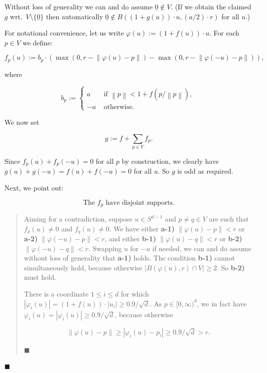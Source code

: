 \documentclass[11pt]{article}%
\newenvironment{proof}{\vspace{1ex}\noindent{\bf Proof.}}{\hspace*{\fill}$\blacksquare$\vspace{1ex}}
\newenvironment{proofof}[1]{\vspace{1ex}\noindent{\bf Proof of #1.}}{\hspace*{\fill}$\blacksquare$\vspace{1ex}}
\newcommand{\norm}[1]{\ensuremath{\left\|#1\right\|}}
\newcommand{\orig}{\underline{0}}
\begin{document}
\begin{proof}
Without loss of generality we can and do assume $\orig \not\in V$. (If we obtain the 
claimed $g$ wrt.~$V \setminus \{\orig\}$ then automatically $\orig \not\in B\left( (1+g(u)) \cdot u, (a/2)\cdot r  \right)$
for all $u$.)

For notational convenience, let us write $\varphi(u) := (1+f(u)) \cdot u$.
For each $p \in V$ we define:

$$ f_{p}(u) := b_p \cdot \left( \max\left(0,r-\norm{\varphi(u)-p}\right)
- \max\left(0, r-\norm{\varphi(-u)-p}\right)\right), $$

\noindent
where 

$$ b_p := \begin{cases}
         a & \text{ if $\norm{p} < 1+f(p/\norm{p})$, }\\
         -a & \text{ otherwise. }
        \end{cases} $$

\noindent
We now set

$$ g := f + \sum_{p \in V} f_p. $$

\noindent
Since $f_p(u)+f_p(-u)=0$ for all $p$ by construction, 
we clearly have $g(u)+g(-u)=f(u)+f(-u)=0$ for all $u$. So $g$ is odd as required.

Next, we point out:

\begin{equation}\label{eq:disjsupp} 
\text{The $f_p$ have disjoint supports.} 
\end{equation}

\begin{quote}\begin{proofof}{\eqref{eq:disjsupp}} 
Aiming for a contradiction, suppose $u \in S^{d-1}$ and $p \neq q \in V$ are such that 
$f_p(u) \neq 0$ and $f_{q}(u) \neq 0$.
We have either {\bf a-1)} $\norm{\varphi(u)-p} < r$ or {\bf a-2)} $\norm{\varphi(-u)-p} < r$, and 
either {\bf b-1)} $\norm{\varphi(u)-q} < r$ or {\bf b-2)} $\norm{\varphi(-u)-q} < r$.
Swapping $u$ for $-u$ if needed, we can and do assume without loss of generality that 
{\bf a-1)} holds.
The condition {\bf b-1)} cannot simultaneously hold, because otherwise 
$|B( \varphi(u), r ) \cap V | \geq 2$. So {\bf b-2)} must hold.

There is a coordinate $1\leq i \leq d$ for which $|\varphi_i(u)| = (1+f(u)) \cdot |u_i| \geq 0.9/\sqrt{d}$. 
As $p \in [0,\infty)^d$, we in fact have $\varphi_i(u) = |\varphi_i(u)| \geq 0.9/\sqrt{d}$, because otherwise

$$ \norm{\varphi(u)-p} \geq |\varphi_i(u)-p_i| \geq 0.9/\sqrt{d} > r. $$


\end{proofof}
\end{quote}
\end{proof}
\end{document}
